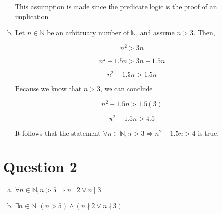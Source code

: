 \documentclass[12pt]{article}
\begin{document}
\begin{enumerate}[a.]
    This assumption is made since the predicate logic is the proof of an implication

    \item

    Let $n \in \mathbb{N}$ be an arbitruary number of $\mathbb{N}$, and assume $n > 3$. Then,

    \setcounter{equation}{0}
    \begin{equation}
        n^2 > 3n
    \end{equation}

    \begin{equation}
        n^2 -1.5n > 3n - 1.5n
    \end{equation}

    \begin{equation}
        n^2 -1.5n > 1.5n
    \end{equation}

    Because we know that $n > 3$, we can conclude

    \begin{equation}
        n^2 -1.5n > 1.5(3)
    \end{equation}

    \begin{equation}
        n^2 -1.5n > 4.5
    \end{equation}

    It follows that the statement $\forall n \in \mathbb{N}, n > 3 \Rightarrow n^2 - 1.5n > 4$ is true.

\end{enumerate}

\section*{Question 2}
\begin{enumerate}[a.]
    \item $\forall n \in \mathbb{N}, n > 5 \Rightarrow n \mid 2 \lor n \mid 3$
    \item $\exists n \in \mathbb{N}, (n > 5) \land (n \nmid 2 \lor n \nmid 3)$
\end{enumerate}
\end{document}
